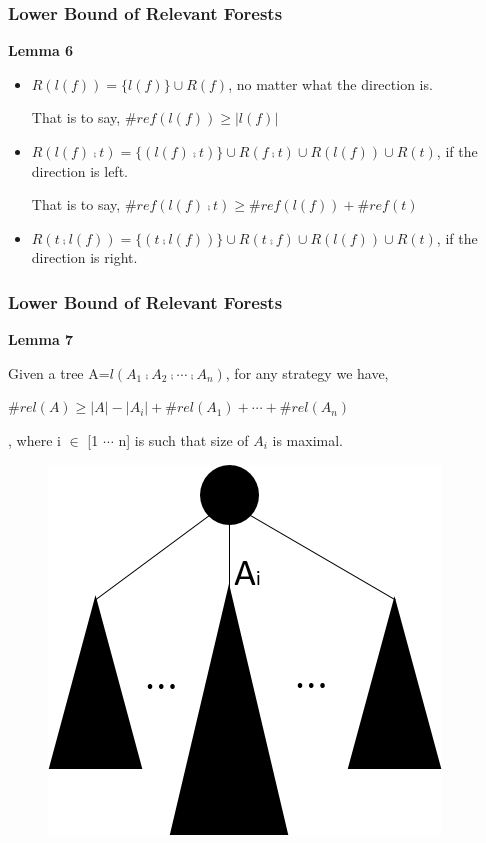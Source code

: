 \documentclass{beamer}
\begin{document}
\begin{frame}
\frametitle{Lower Bound of Relevant Forests}
\textbf{Lemma 6}
\begin{itemize}
\item $R(l(f)) = \{l(f)\} \cup R(f)$, no matter what the direction is. 

That is to say, $\#ref(l(f)) \geq \left\vert l(f) \right\vert $ 
\item $R(l(f) \comp t) = \{(l(f) \comp t)\} \cup R(f \comp t) \cup R(l(f)) \cup R(t)$, if the direction is left. 

That is to say, $\#ref(l(f) \comp t) \geq \#ref(l(f)) + \#ref(t)$
\item $R(t \comp l(f)) = \{(t \comp l(f))\} \cup R(t \comp f) \cup R(l(f)) \cup R(t)$, if the direction is right.
\end{itemize}
\end{frame}

\begin{frame}
\frametitle{Lower Bound of Relevant Forests}
\textbf{Lemma 7}

Given a tree A=$l(A_1 \comp A_2 \comp \cdots \comp A_n)$, for any strategy we have,

$\#rel(A) \geq \left\vert A \right\vert - \left\vert A_i \right\vert + \#rel(A_1) + \cdots + \#rel(A_n)$

, where i $\in$ [1 $\cdots$ n] is such that size of $A_i$ is maximal.
\begin{figure}
	\includegraphics[width=0.3\linewidth]{lemma7}
	\label{Lemma 7} 
	\centering
\end{figure}
\end{frame}
\end{document}
